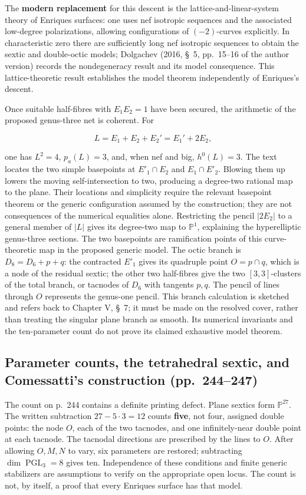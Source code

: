 The \textbf{modern replacement} for this descent is the lattice-and-linear-system theory of Enriques surfaces: one uses nef isotropic sequences and the associated low-degree polarizations, allowing configurations of \((-2)\)-curves explicitly. In characteristic zero there are sufficiently long nef isotropic sequences to obtain the sextic and double-octic models; Dolgachev (2016, \S~5, pp.~15--16 of the author version) records the nondegeneracy result and its model consequence. This lattice-theoretic result establishes the model theorem independently of Enriques's descent.

Once suitable half-fibres with \(E_1E_2=1\) have been secured, the arithmetic of the proposed genus-three net is coherent. For

\[
L=E_1+E_2+E_2'=E_1'+2E_2,
\]

one has \(L^2=4\), \(p_a(L)=3\), and, when nef and big, \(h^0(L)=3\). The text locates the two simple basepoints at \(E'_1\cap E_2\) and \(E_1\cap E'_2\). Blowing them up lowers the moving self-intersection to two, producing a degree-two rational map to the plane. Their locations and simplicity require the relevant basepoint theorem or the generic configuration assumed by the construction; they are not consequences of the numerical equalities alone. Restricting the pencil \(\vert 2E_2\vert \) to a general member of \(\vert L\vert \) gives its degree-two map to \(\mathbb P^1\), explaining the hyperelliptic genus-three sections. The two basepoints are ramification points of this curve-theoretic map in the proposed generic model. The octic branch is \(D_8=D_6+p+q\): the contracted \(E'_1\) gives its quadruple point \(O=p\cap q\), which is a node of the residual sextic; the other two half-fibres give the two \([3,3]\)-clusters of the total branch, or tacnodes of \(D_6\) with tangents \(p,q\). The pencil of lines through \(O\) represents the genus-one pencil. This branch calculation is sketched and refers back to Chapter V, \S~7; it must be made on the resolved cover, rather than treating the singular plane branch as smooth. Its numerical invariants and the ten-parameter count do not prove its claimed exhaustive model theorem.

\subsection{Parameter counts, the tetrahedral sextic, and Comessatti's construction (pp.~244--247)}\label{cp2-vii-1-3}

The count on p.~244 contains a definite printing defect. Plane sextics form \(\mathbb P^{27}\). The written subtraction \(27-5\cdot3=12\) counts \textbf{five}, not four, assigned double points: the node \(O\), each of the two tacnodes, and one infinitely-near double point at each tacnode. The tacnodal directions are prescribed by the lines to \(O\). After allowing \(O,M,N\) to vary, six parameters are restored; subtracting \(\dim\operatorname{PGL}_3=8\) gives ten. Independence of these conditions and finite generic stabilizers are assumptions to verify on the appropriate open locus. The count is not, by itself, a proof that every Enriques surface has that model.

